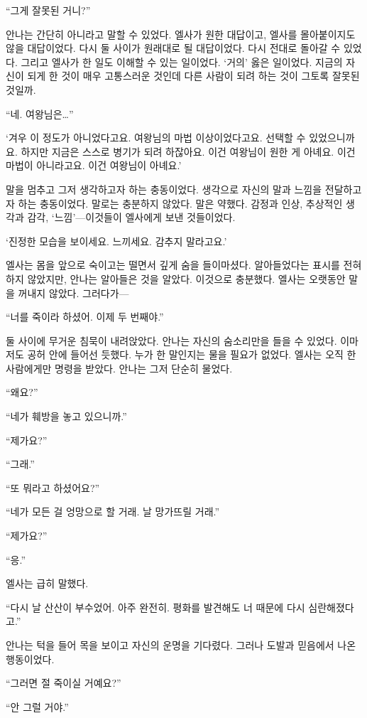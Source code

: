 ``그게 잘못된 거니?''

안나는 간단히 아니라고 말할 수 있었다. 엘사가 원한 대답이고, 엘사를 몰아붙이지도 않을 대답이었다. 다시 둘 사이가 원래대로 될 대답이었다. 다시 전대로 돌아갈 수 있었다. 그리고 엘사가 한 일도 이해할 수 있는 일이었다. `거의' 옳은 일이었다. 지금의 자신이 되게 한 것이 매우 고통스러운 것인데 다른 사람이 되려 하는 것이 그토록 잘못된 것일까.

``네. 여왕님은\ldots''

`겨우 이 정도가 아니었다고요. 여왕님의 마법 이상이었다고요. 선택할 수 있었으니까요. 하지만 지금은 스스로 병기가 되려 하잖아요. 이건 여왕님이 원한 게 아녜요. 이건 마법이 아니라고요. 이건 여왕님이 아녜요.'

말을 멈추고 그저 생각하고자 하는 충동이었다. 생각으로 자신의 말과 느낌을 전달하고자 하는 충동이었다. 말로는 충분하지 않았다. 말은 약했다. 감정과 인상, 추상적인 생각과 감각, `느낌'—이것들이 엘사에게 보낸 것들이었다.

`진정한 모습을 보이세요. 느끼세요. 감추지 말라고요.'

엘사는 몸을 앞으로 숙이고는 떨면서 깊게 숨을 들이마셨다. 알아들었다는 표시를 전혀 하지 않았지만, 안나는 알아들은 것을 알았다. 이것으로 충분했다. 엘사는 오랫동안 말을 꺼내지 않았다. 그러다가—

``너를 죽이라 하셨어. 이제 두 번째야.''

둘 사이에 무거운 침묵이 내려앉았다. 안나는 자신의 숨소리만을 들을 수 있었다. 이마저도 공허 안에 들어선 듯했다. 누가 한 말인지는 물을 필요가 없었다. 엘사는 오직 한 사람에게만 명령을 받았다. 안나는 그저 단순히 물었다.

``왜요?''

``네가 훼방을 놓고 있으니까.''

``제가요?''

``그래.''

``또 뭐라고 하셨어요?''

``네가 모든 걸 엉망으로 할 거래. 날 망가뜨릴 거래.''

``제가요?''

``응.''

엘사는 급히 말했다.

``다시 날 산산이 부수었어. 아주 완전히. 평화를 발견해도 너 때문에 다시 심란해졌다고.''

안나는 턱을 들어 목을 보이고 자신의 운명을 기다렸다. 그러나 도발과 믿음에서 나온 행동이었다.

``그러면 절 죽이실 거예요?''

``안 그럴 거야.''

